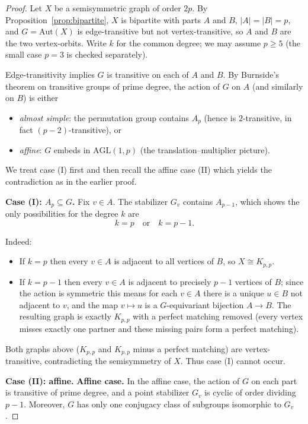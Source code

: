 \documentclass[12pt,a4paper,openany]{book}
\newcommand{\Aut}{\mathrm{Aut}}
\newcommand{\AGL}{\mathrm{AGL}}
\renewcommand{\AGL}{\mathrm{AGL}}
\begin{document}
\begin{proof}
 
Let $X$ be a semisymmetric graph of order $2p$. By Proposition~\ref{prop:bipartite}, $X$ is bipartite with parts
$A$ and $B$, $|A|=|B|=p$, and $G=\Aut(X)$ is edge-transitive but not vertex-transitive, so $A$ and $B$ are the two vertex-orbits.
Write $k$ for the common degree; we may assume $p\ge5$ (the small case $p=3$ is checked separately).

Edge-transitivity implies $G$ is transitive on each of $A$ and $B$. By Burnside's theorem on transitive groups of prime degree,
the action of $G$ on $A$ (and similarly on $B$) is either
\begin{itemize}
  \item[(I)] \emph{almost simple}: the permutation group contains $A_p$ (hence is $2$-transitive, in fact $(p-2)$-transitive), or
  \item[(II)] \emph{affine}: $G$ embeds in $\AGL(1,p)$ (the translation–multiplier picture).
\end{itemize}

We treat case (I) first and then recall the affine case (II) which yields the contradiction as in the earlier proof.

\medskip
\noindent\textbf{Case (I): $A_p\subseteq G$.}
Fix $v\in A$. The stabilizer $G_v$ contains $A_{p-1}$, which  shows the only possibilities for the degree $k$ are
\[
k=p \quad\text{or}\quad k=p-1.
\]

Indeed:
\begin{itemize}
  \item If $k=p$ then every $v\in A$ is adjacent to all vertices of $B$, so $X\cong K_{p,p}$.
  \item If $k=p-1$ then every $v\in A$ is adjacent to precisely $p-1$ vertices of $B$; since the action is symmetric this means for each $v\in A$ there is a unique $u\in B$ not adjacent to $v$, and the map $v\mapsto u$ is a $G$-equivariant bijection $A\to B$. The resulting graph is exactly $K_{p,p}$ with a perfect matching removed (every vertex misses exactly one partner and these missing pairs form a perfect matching).
\end{itemize}

Both graphs above (\(K_{p,p}\) and \(K_{p,p}\) minus a perfect matching) are vertex-transitive, contradicting the semisymmetry of \(X\). Thus case (I) cannot occur.

\medskip
\noindent\textbf{Case (II): affine.}
\medskip
\noindent\textbf{Affine case.}  
In the affine case, the action of $G$ on each part is transitive of prime degree, and a point stabilizer $G_v$ is cyclic of order dividing $p-1$. Moreover, $G$ has only one conjugacy class of subgroups isomorphic to $G_v$.  


\end{proof}
\end{document}
